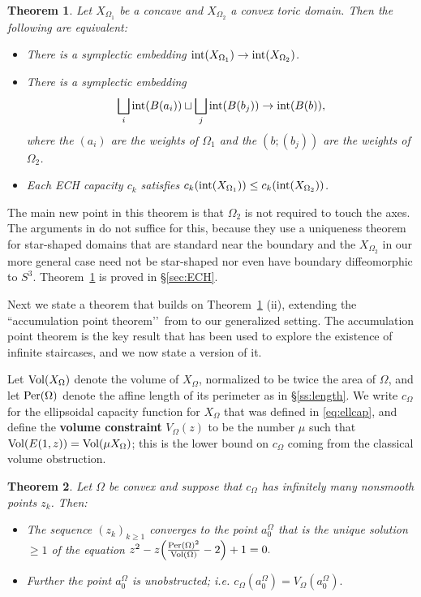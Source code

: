 \documentclass[11pt, reqno]{amsart}
\newtheorem{thm}{Theorem}[subsection]
\theoremstyle{remark}
\numberwithin{equation}{subsection}
\numberwithin{figure}{section}
\theoremstyle{customremark}
\newcommand{\Vol}{{\rm Vol}}
\newcommand{\Per}{{\rm Per}}
\newcommand{\intt}{{\rm int}}
\newcommand{\Om}{{\Omega}}
\begin{document}
\begin{thm}
\label{thm:main}
Let $X_{\Omega_1}$ be a concave and $X_{\Omega_2}$ a convex toric domain.  Then the following are equivalent:
\begin{itemize}
\item[{\rm (i)}] There is a symplectic embedding $\intt(X_{\Omega_1}) \to \intt(X_{\Omega_2})$.
\item[{\rm (ii)}]  There is a symplectic embedding 
\[ \bigsqcup_i \intt(B(a_i)) \sqcup  \bigsqcup_j\intt(B(b_j)) \to \intt(B(b)),\]
where the $(a_i)$ are the weights of $\Omega_1$ and the $(b;(b_j))$ are the weights of $\Omega_2$.
\item[{\rm (iii)}]  Each ECH capacity $c_k$ satisfies $c_k(\intt(X_{\Omega_1})) \le c_k( \intt(X_{\Omega_2}))$. 
\end{itemize}
\end{thm}


The main new point in this theorem is that $\Omega_2$ is not required to touch the axes.  The arguments in \cite{CG} do not suffice for this, because they use a uniqueness theorem for star-shaped domains that are standard near the boundary and the $X_{\Omega_2}$ in our more general case need not be star-shaped nor even have boundary diffeomorphic to $S^3$.  
Theorem~\ref{thm:main} is proved in \S\ref{sec:ECH}. 


Next we state a theorem that builds on Theorem~\ref{thm:main} (ii), extending
 the ``accumulation point theorem\rq\rq\,  from \cite{AADT}  
 to our generalized setting.  The accumulation point theorem is the key result
 that has been used to explore the existence of infinite staircases, and we now state a version of it.


Let $\Vol(X_\Om)$ denote the volume of $X_{\Om}$, normalized to be twice the area of $\Omega$, and let $\Per(\Om)$ denote the affine length of its perimeter as in \S\ref{ss:length}. We write $c_{\Om}$ for
 the ellipsoidal capacity function for $X_\Om$ that was defined in \eqref{eq:ellcap},
and define the
{\bf volume constraint}  $V_\Om(z)$ to be the number $\mu$ such that $\Vol(E(1,z)) = \Vol(\mu X_\Om)$; this is the lower bound on $c_{\Om}$ coming from the classical volume obstruction.  

 \begin{thm}
\label{thm:acc}
 Let $\Om$ be convex and suppose that  $c_\Om$ has infinitely many  nonsmooth points $z_k$. Then:
 \begin{itemize}\item[{\rm (i)}]  The %
 sequence $(z_k)_{k\ge 1}$ converges to the point $a^{\Om}_0$ that is
the unique solution $\ge 1$ of the equation $z^2 - z\Bigl(\frac{\Per(\Om)^2}{\Vol(\Om)} - 2\Bigr) + 1 = 0.$
\item[{\rm (ii)}]  %
Further the point $a_0^\Om$ is unobstructed; i.e.  $
c_\Om(a^{\Om}_0) = V_\Om(a^{\Om}_0).
$
\end{itemize}
\end{thm}
\end{document}
